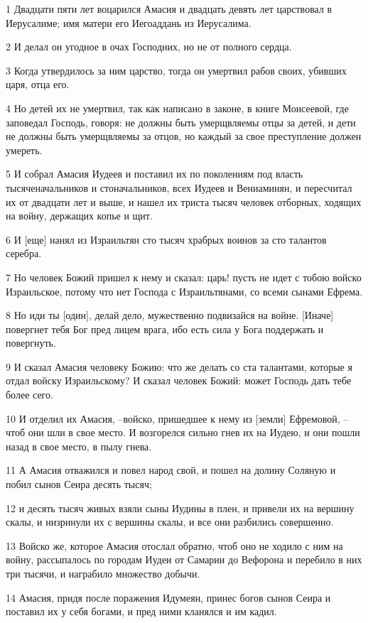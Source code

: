 \par 1 Двадцати пяти лет воцарился Амасия и двадцать девять лет царствовал в Иерусалиме; имя матери его Иегоаддань из Иерусалима.
\par 2 И делал он угодное в очах Господних, но не от полного сердца.
\par 3 Когда утвердилось за ним царство, тогда он умертвил рабов своих, убивших царя, отца его.
\par 4 Но детей их не умертвил, так как написано в законе, в книге Моисеевой, где заповедал Господь, говоря: не должны быть умерщвляемы отцы за детей, и дети не должны быть умерщвляемы за отцов, но каждый за свое преступление должен умереть.
\par 5 И собрал Амасия Иудеев и поставил их по поколениям под власть тысяченачальников и стоначальников, всех Иудеев и Вениаминян, и пересчитал их от двадцати лет и выше, и нашел их триста тысяч человек отборных, ходящих на войну, держащих копье и щит.
\par 6 И [еще] нанял из Израильтян сто тысяч храбрых воинов за сто талантов серебра.
\par 7 Но человек Божий пришел к нему и сказал: царь! пусть не идет с тобою войско Израильское, потому что нет Господа с Израильтянами, со всеми сынами Ефрема.
\par 8 Но иди ты [один], делай дело, мужественно подвизайся на войне. [Иначе] повергнет тебя Бог пред лицем врага, ибо есть сила у Бога поддержать и повергнуть.
\par 9 И сказал Амасия человеку Божию: что же делать со ста талантами, которые я отдал войску Израильскому? И сказал человек Божий: может Господь дать тебе более сего.
\par 10 И отделил их Амасия, --войско, пришедшее к нему из [земли] Ефремовой, --чтоб они шли в свое место. И возгорелся сильно гнев их на Иудею, и они пошли назад в свое место, в пылу гнева.
\par 11 А Амасия отважился и повел народ свой, и пошел на долину Соляную и побил сынов Сеира десять тысяч;
\par 12 и десять тысяч живых взяли сыны Иудины в плен, и привели их на вершину скалы, и низринули их с вершины скалы, и все они разбились совершенно.
\par 13 Войско же, которое Амасия отослал обратно, чтоб оно не ходило с ним на войну, рассыпалось по городам Иудеи от Самарии до Вефорона и перебило в них три тысячи, и награбило множество добычи.
\par 14 Амасия, придя после поражения Идумеян, принес богов сынов Сеира и поставил их у себя богами, и пред ними кланялся и им кадил.
